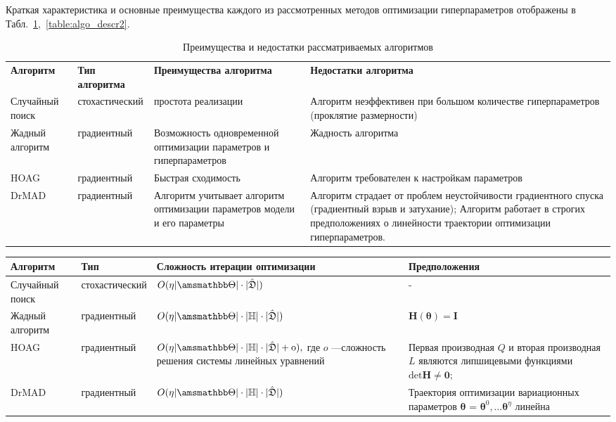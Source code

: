 \documentclass[11pt, a5paper]{dissert}
\theoremstyle{definition}
\begin{document}
{Краткая характеристика и основные преимущества каждого из рассмотренных методов оптимизации гиперпараметров отображены в Табл.~\ref{table:algo_descr},~\ref{table:algo_descr2}.

\begin{table}[tbh!]
\small

\begin{tabularx}{\textwidth}{|X|X|X|X|}
\hline
\bf Алгоритм & \bf Тип алгоритма & \bf Преимущества алгоритма & \bf Недостатки алгоритма  \\ 
Случайный поиск & стохастический & простота реализации& Алгоритм неэффективен при большом количестве гиперпараметров (проклятие размерности)  \\ \hline
Жадный алгоритм~\cite{greed_hyper} & градиентный & Возможность одновременной оптимизации параметров и гиперпараметров & Жадность алгоритма \\ \hline
HOAG~\cite{hyper_hoag} & градиентный & Быстрая сходимость & Алгоритм требователен к настройкам параметров \\ \hline 
DrMAD~\cite{hyper_mad} & градиентный & Алгоритм учитывает алгоритм оптимизации параметров модели и его параметры & Алгоритм страдает от проблем неустойчивости градиентного спуска (градиентный взрыв и затухание); Алгоритм работает в строгих предположениях о линейности траектории оптимизации гиперпараметров.\\ \hline
\end{tabularx}

\caption{Преимущества и недостатки рассматриваемых алгоритмов}
\label{table:algo_descr}

\end{table}


\begin{table}[tbh!]
\small

\begin{tabularx}{\textwidth}{|X|X|X|X|}
\hline
\bf Алгоритм & \bf Тип & \bf Сложность итерации оптимизации & \bf Предположения \\ 
\hline
Случайный поиск & стохастический & $O(\eta |\Tetab|\cdot |\hat{\mathfrak{D}}|)$& -  \\ \hline
Жадный алгоритм~\cite{greed_hyper} & градиентный & $O(\eta |\Tetab|\cdot|\Hb|\cdot |\hat{\mathfrak{D}}|)$ & $\mathbf{H}(\boldsymbol{\theta}) = \mathbf{I}$  \\ \hline
HOAG~\cite{hyper_hoag} & градиентный & $O(\eta |\Tetab|\cdot|\Hb| \cdot |\hat{\mathfrak{D}}| + \text{o}),$ где $o$ ---сложность решения системы линейных уравнений& Первая производная $Q$  и вторая производная $L$  являются липшицевыми функциями  $\text{det}\mathbf{H} \neq \mathbf{0}$;  \\ \hline
DrMAD~\cite{hyper_mad} & градиентный &$O(\eta |\Tetab|\cdot|\Hb| \cdot|\hat{\mathfrak{D}}|)$ & Траектория оптимизации вариационных параметров $\boldsymbol{\theta}$ = $\boldsymbol{\theta}^0, \dots \boldsymbol{\theta}^\eta$  линейна \\ \hline
\end{tabularx}


\end{table}}
\end{document}
